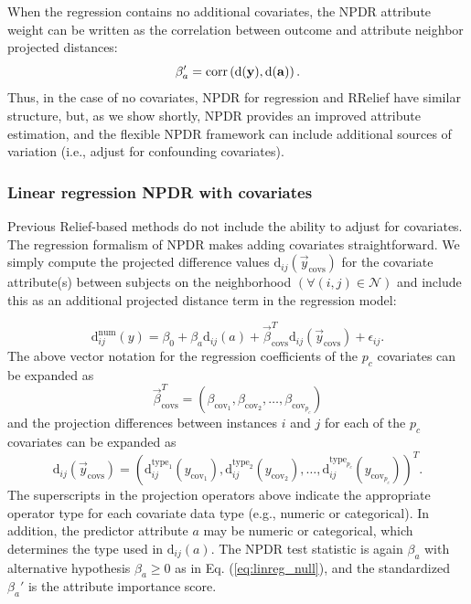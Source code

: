 \documentclass{bioinfo}
\begin{document}
When the regression contains no additional covariates, the NPDR attribute weight can be written as the correlation between outcome and attribute neighbor projected distances:
\begin{equation}
\beta'_a = \text{corr}\left( \bf{\text{d}}(\bf{y}), \bf{\text{d}}(\bf{a}) \right).
\end{equation}
Thus, in the case of no covariates, NPDR for regression and RRelief have similar structure, but, as we show shortly, NPDR provides an improved attribute estimation, and the flexible NPDR framework can include additional sources of variation (i.e., adjust for confounding covariates).


\subsubsection{Linear regression NPDR with covariates}
Previous Relief-based methods do not include the ability to adjust for covariates.
The regression formalism of NPDR makes adding covariates straightforward.
We simply compute the projected difference values $\text{d}_{ij}(\vec{y}_{\text{covs}})$ for the covariate attribute(s) between subjects on the neighborhood $(\forall(i,j) \in \mathcal{N})$ and include this as an additional projected distance term in the regression model:

\begin{equation}\label{eq:lin_reg_cov}
    \text{d}^{\text{num}}_{ij}(y) = \beta_{0} + \beta_{a} \text{d}_{ij}(a) + \vec{\beta}^{T}_{\text{covs}}\text{d}_{ij}(\vec{y}_{\text{covs}}) + \epsilon_{ij}.
\end{equation}
The above vector notation for the regression coefficients of the $p_c$ covariates can be expanded as  
\begin{equation}
\vec{\beta}^{T}_{\text{covs}} = \left( \beta_{\text{cov}_1}, \beta_{\text{cov}_2}, \ldots,  \beta_{\text{cov}_{p_c}} \right)
\end{equation}
and the projection differences between instances $i$ and $j$ for each of the $p_c$ covariates can be expanded as
\begin{equation}
\text{d}_{ij}(\vec{y}_\text{covs})= \left( \text{d}^{\text{type}_1}_{ij}({y}_{\text{cov}_1}), \text{d}^{\text{type}_2}_{ij}({y}_{\text{cov}_2}), \ldots, \text{d}^{\text{type}_{p_c}}_{ij}({y}_{\text{cov}_{p_c}}) \right)^{T}.
\end{equation}
The superscripts in the projection operators above indicate the appropriate operator type for each covariate data type (e.g., numeric or categorical).
In addition, the predictor attribute $a$ may be numeric or categorical, which determines the type used in $\text{d}_{ij}(a)$.
The NPDR test statistic is again $\beta_a$ with alternative hypothesis $\beta_a \ge 0$ as in Eq. (\ref{eq:linreg_null}), and the standardized $\beta_a'$ is the attribute importance score. 
\end{document}
